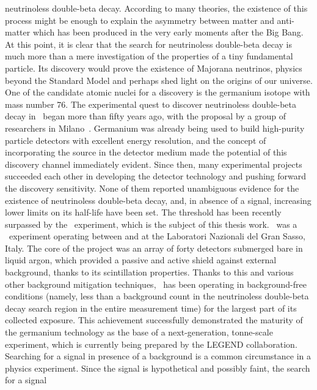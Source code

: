 neutrinoless double-beta decay. According to many theories, the existence of this process
might be enough to explain the asymmetry between matter and anti-matter which has been
produced in the very early moments after the Big Bang. At this point, it is clear that
the search for neutrinoless double-beta decay is much more than a mere investigation of
the properties of a tiny fundamental particle. Its discovery would prove the existence of
Majorana neutrinos, physics beyond the Standard Model and perhaps shed light on the
origins of our universe.
\newpar
{}
One of the candidate atomic nuclei for a discovery is the germanium isotope with mass
number 76. The experimental quest to discover neutrinoless double-beta decay in \gesix\
began more than fifty years ago, with the proposal by a group of researchers in
Milano~\cite{Fiorini1967}.  Germanium was already being used to build high-purity particle
detectors with excellent energy resolution, and the concept of incorporating the source in
the detector medium made the potential of this discovery channel immediately evident.
Since then, many experimental projects succeeded each other in developing the detector
technology and pushing forward the discovery sensitivity. None of them reported
unambiguous evidence for the existence of neutrinoless double-beta decay, and, in absence
of a signal, increasing lower limits on its half-life have been set. The \powtenyr{26}
threshold has been recently surpassed by the \gerda\ experiment, which is the subject of
this thesis work. \gerda\ was a \gesix\ experiment operating between \yr{2008} and
\yr{2019} at the Laboratori Nazionali del Gran Sasso, Italy. The core of the project was
an array of forty detectors submerged bare in liquid argon, which provided a passive and
active shield against external background, thanks to its scintillation properties. Thanks
to this and various other background mitigation techniques, \gerda\ has been operating in
background-free conditions (namely, less than a background count in the neutrinoless
double-beta decay search region in the entire measurement time) for the largest part of
its collected exposure. This achievement successfully demonstrated the maturity of the
germanium technology as the base of a next-generation, tonne-scale experiment, which is
currently being prepared by the LEGEND collaboration.
\newpar
Searching for a signal in presence of a background is a common circumstance in a physics
experiment. Since the signal is hypothetical and possibly faint, the search for a signal
